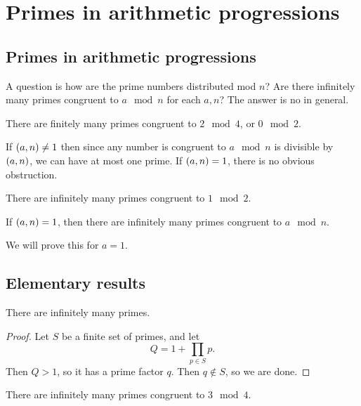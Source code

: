 \pagebreak

\section{Primes in arithmetic progressions}

\subsection{Primes in arithmetic progressions}

A question is how are the prime numbers distributed mod $ n $? Are there infinitely many primes congruent to $ a \mod n $ for each $ a, n $? The answer is no in general.

\begin{example*}
There are finitely many primes congruent to $ 2 \mod 4 $, or $ 0 \mod 2 $.
\end{example*}

If $ \br{a, n} \ne 1 $ then since any number is congruent to $ a \mod n $ is divisible by $ \br{a, n} $, we can have at most one prime. If $ \br{a, n} = 1 $, there is no obvious obstruction.

\begin{example*}
There are infinitely many primes congruent to $ 1 \mod 2 $.
\end{example*}

\begin{theorem}
If $ \br{a, n} = 1 $, then there are infinitely many primes congruent to $ a \mod n $.
\end{theorem}

We will prove this for $ a = 1 $.

\subsection{Elementary results}

\begin{theorem}
There are infinitely many primes.
\end{theorem}

\begin{proof}
Let $ S $ be a finite set of primes, and let
$$ Q = 1 + \prod_{p \in S} p. $$
Then $ Q > 1 $, so it has a prime factor $ q $. Then $ q \notin S $, so we are done.
\end{proof}

\begin{theorem}
There are infinitely many primes congruent to $ 3 \mod 4 $.
\end{theorem}

